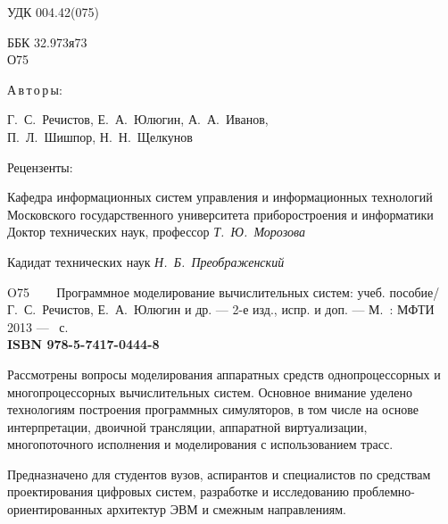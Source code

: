 
\thispagestyle{empty}
\begingroup
\small
\begin{flushleft}
УДК 004.42(075)

ББК 32.973я73\\
\enskip \enskip \enskip \enskip \enskip О75    
\end{flushleft}
\begin{center}
\begin{normalsize}
\textsf{{А\,в\,т\,о\,р\,ы}:}
\end{normalsize}
Г.~С.~Речистов, Е.~А.~Юлюгин, А.~А.~Иванов, \\
П.~Л.~Шишпор, Н.~Н.~Щелкунов\\
\end {center}

\begin{center}
Рецензенты:

Кафедра информационных систем управления и информационных технологий Московского государственного университета приборостроения и информатики\\
Доктор технических наук, профессор \textit{Т.~Ю.~Морозова}

Кадидат технических наук \textit{Н.~Б.~Преображенский }

\end{center}

\noindent O75 ~~~ {Программное моделирование вычислительных систем}: учеб. пособие/ \\Г.~С.~Речистов, Е.~А.~Юлюгин и др. — 2-е изд., испр. и доп. — М.~: МФТИ 2013 — \pageref{page:lastpage}~с.\\
\textbf{ISBN 978-5-7417-0444-8}
\medskip

Рассмотрены вопросы моделирования аппаратных средств однопроцессорных и многопроцессорных вычислительных систем. Основное внимание уделено технологиям построения программных симуляторов, в том числе на основе интерпретации, двоичной трансляции, аппаратной виртуализации, многопоточного исполнения и моделирования с использованием трасс.

Предназначено для студентов вузов, аспирантов и специалистов по средствам проектирования цифровых систем, разработке и исследованию проблемно-ориентированных архитектур ЭВМ и смежным направлениям. 

